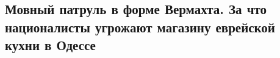  
 
 
 
 
\subsection{Мовный патруль в форме Вермахта. За что националисты угрожают магазину еврейской кухни в Одессе}

